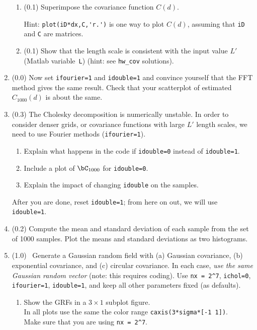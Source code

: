 \documentclass[11pt,titlepage,fleqn]{article}
\begin{document}
\begin{enumerate}
\begin{enumerate}
\item (0.1) Superimpose the covariance function $C(d)$.

Hint: \verb+plot(iD*dx,C,'r.')+ is one way to plot $C(d)$, assuming that \verb+iD+ and \verb+C+ are matrices.

\item (0.1) Show that the length scale is consistent with the input value $L'$ (Matlab variable~\verb+L+) (hint: see \verb+hw_cov+ solutions).
\end{enumerate}

\item (0.0) Now set \verb+ifourier=1+ and \verb+idouble=1+ and convince yourself that the FFT method gives the same result. Check that your scatterplot of estimated $C_{1000}(d)$ is about the same.

\item (0.3) The Cholesky decomposition is numerically unstable. In order to consider denser grids, or covariance functions with large $L'$ length scales, we need to use Fourier methods (\verb+ifourier=1+).

\begin{enumerate}
\item Explain what happens in the code if \verb+idouble=0+ instead of \verb+idouble=1+.
\item Include a plot of $\bC_{1000}$ for \verb+idouble=0+.
\item Explain the impact of changing \verb+idouble+ on the samples.
\end{enumerate}
%
After you are done, reset \verb+idouble=1+; from here on out, we will use \verb+idouble=1+.

\item (0.2) Compute the mean and standard deviation of each sample from the set of 1000 samples. Plot the means and standard deviations as two histograms.

\item (1.0) \ptag\ Generate a Gaussian random field with (a) Gaussian covariance, (b) exponential covariance, and (c) circular covariance. In each case, {\em use the same Gaussian random vector} (note: this requires coding). Use \verb+nx = 2^7+, \verb+ichol=0+, \verb+ifourier=1+, \verb+idouble=1+, and keep all other parameters fixed (as defaults).
%
\begin{enumerate}
\item Show the GRFs in a $3 \times 1$ subplot figure. \\
In all plots use the same the color range \verb+caxis(3*sigma*[-1 1])+. \\
Make sure that you are using \verb+nx = 2^7+.


\end{enumerate}
\end{enumerate}
\end{document}
